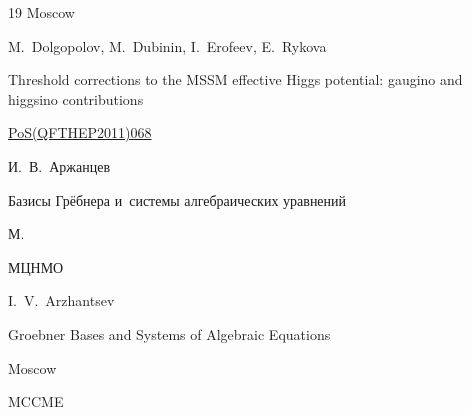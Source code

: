 \begin{thebibliography}{19}
\publaddr Moscow












\by M.~Dolgopolov, M.~Dubinin, I.~Erofeev, E.~Rykova

\eprint Threshold corrections to the MSSM effective Higgs potential: gaugino and higgsino contributions

\eprintinfo \href{http://pos.sissa.it/archive/conferences/138/068/QFTHEP2011_068.pdf}{PoS(QFTHEP2011)068}




\by И.~В.~Аржанцев

\book Базисы Грёбнера и~системы алгебраических уравнений

\publaddr М.

\publ МЦНМО



\misctransl

\by I.~V.~Arzhantsev

\book  Groebner Bases and Systems of Algebraic Equations

\publaddr Moscow

\publaddr MCCME





\end{thebibliography}





\noindent

\hskip6.5cm \thedate \par\noindent

\hskip6.5cm\therevdate












%





\makeengtitle





\renewcommand{\baselinestretch}{0.9}





 \newpage

%


%

%


